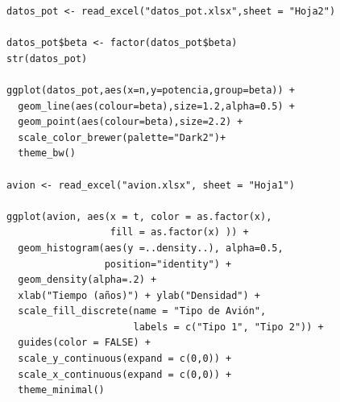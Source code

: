\documentclass[12pt,a4paper]{article}
\begin{document}
\begin{verbatim}
datos_pot <- read_excel("datos_pot.xlsx",sheet = "Hoja2")

datos_pot$beta <- factor(datos_pot$beta)
str(datos_pot)

ggplot(datos_pot,aes(x=n,y=potencia,group=beta)) +
  geom_line(aes(colour=beta),size=1.2,alpha=0.5) +
  geom_point(aes(colour=beta),size=2.2) +
  scale_color_brewer(palette="Dark2")+
  theme_bw()

avion <- read_excel("avion.xlsx", sheet = "Hoja1")

ggplot(avion, aes(x = t, color = as.factor(x),
                  fill = as.factor(x) )) +
  geom_histogram(aes(y =..density..), alpha=0.5, 
                 position="identity") +
  geom_density(alpha=.2) +
  xlab("Tiempo (años)") + ylab("Densidad") +
  scale_fill_discrete(name = "Tipo de Avión", 
                      labels = c("Tipo 1", "Tipo 2")) + 
  guides(color = FALSE) +
  scale_y_continuous(expand = c(0,0)) +
  scale_x_continuous(expand = c(0,0)) +
  theme_minimal()
\end{verbatim}
\end{document}

